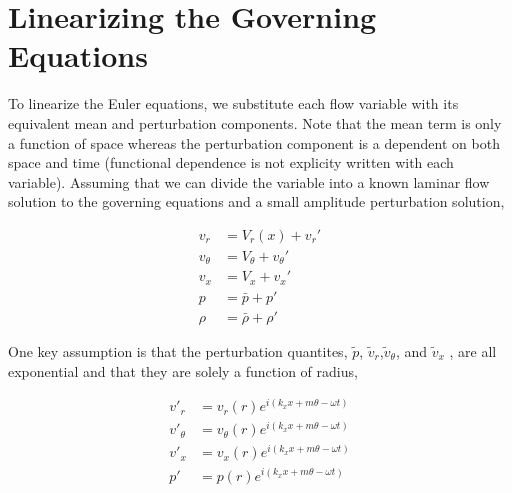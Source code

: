 
\section{Linearizing the Governing Equations}
To linearize the Euler equations, we substitute each flow variable with its
equivalent mean and perturbation components. Note that the mean term is only a 
function of space whereas the perturbation component is a dependent on both space 
and time (functional dependence is not explicity written with each variable). 
Assuming that we can divide the variable into a known laminar flow solution 
to the governing equations and a small amplitude perturbation solution,

\begin{align}
v_r 		&= V_r(x) + v_r'\\
v_{\theta} 	&= V_{\theta} + v_{\theta}'\\
v_x 		&= V_x + v_x'\\
p 			&= \bar{p} + p'\\
\rho 		&= \bar{\rho} + \rho'
\end{align}

One key assumption is that the perturbation quantites, $\tilde{p}$, 
$\tilde{v}_r$,$\tilde{v}_{\theta}$, and $\tilde{v}_x$ , are all exponential 
and that they are solely a function of radius, 

\begin{align}
    v'_r &= v_r (r) e^{i\left(k_x x + m \theta - \omega t \right)}  \\
    v'_{\theta} &= v_{\theta} (r) e^{i\left(k_x x + m \theta - \omega t \right)} \\ 
    v'_x &= v_x (r) e^{i\left(k_x x + m \theta - \omega t\right)} \\
    p' &= p(r) e^{i\left(k_x x + m \theta - \omega t\right)}
    \label{eqn:perturbationexponents}
\end{align}

